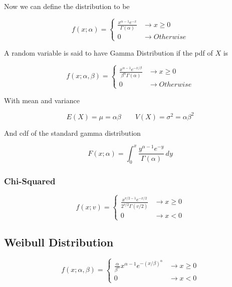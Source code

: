     Now we can define the distribution to be

        \[
            f(x; \alpha) =
            \begin{cases}
                \frac{x^{\alpha - 1}e^{-x}}{\Gamma(\alpha)} &\to x \ge 0\\
                0 &\to Otherwise
            \end{cases}
        \]

    A random variable is said to have Gamma Distribution if the pdf of $X$ is 

        \[
            f(x; \alpha, \beta) =
            \begin{cases}
                \frac{x^{\alpha - 1}e^{-x/\beta}}{\beta^\alpha \Gamma(\alpha)} &\to x \ge 0\\
                0 &\to Otherwise
            \end{cases}
        \]

    With mean and variance

        \[
            E(X) = \mu = \alpha \beta \qquad V(X) = \sigma^2 = \alpha \beta^2
        \]

    And cdf of the standard gamma distribution

        \[
            F(x;\alpha) =
            \int^x_0 \frac{y^{\alpha - 1}e^{-y}}{\Gamma(\alpha)} \, dy
        \]

        \subsubsection{Chi-Squared}
            \[
                f(x; v) = 
                \begin{cases}
                    \frac{x^{v/2 - 1}e^{-x/2}}{2^{v/2} \Gamma(v/2)} &\to x \ge 0\\
                    0 &\to x < 0
                \end{cases}
            \]

    \subsection{Weibull Distribution}
        \[
            f(x; \alpha, \beta) = 
            \begin{cases}
                \frac{\alpha}{\beta^\alpha} x^{\alpha - 1} e^{-(x/\beta)^\alpha} &\to x \ge 0\\
                0 &\to x < 0
            \end{cases}
        \]


